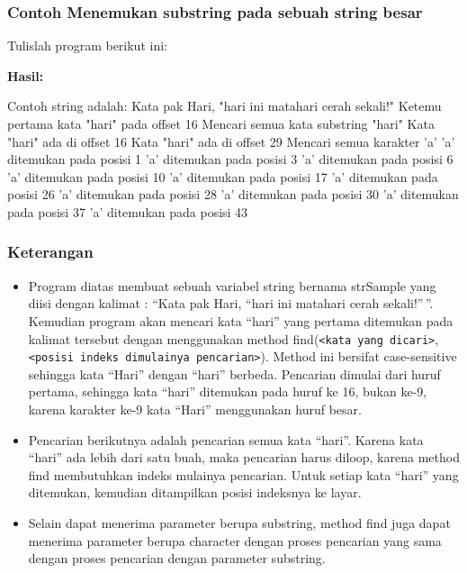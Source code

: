 {{\subsubsection*{Contoh Menemukan substring pada sebuah string besar}

Tulislah program berikut ini:



\textbf{Hasil:}

\begin{lcverbatim}
Contoh string adalah:
Kata pak Hari, "hari ini matahari cerah sekali!"
Ketemu pertama kata "hari" pada offset 16
Mencari semua kata substring "hari"
Kata "hari" ada di offset 16
Kata "hari" ada di offset 29
Mencari semua karakter 'a'
'a' ditemukan pada posisi 1
'a' ditemukan pada posisi 3
'a' ditemukan pada posisi 6
'a' ditemukan pada posisi 10
'a' ditemukan pada posisi 17
'a' ditemukan pada posisi 26
'a' ditemukan pada posisi 28
'a' ditemukan pada posisi 30
'a' ditemukan pada posisi 37
'a' ditemukan pada posisi 43
\end{lcverbatim}

\subsubsection*{Keterangan}

\begin{itemize}

\item
 Program diatas membuat sebuah variabel string bernama strSample yang
 diisi dengan kalimat : ``Kata pak Hari, ``hari ini matahari cerah
 sekali!''\,''. Kemudian program akan mencari kata ``hari'' yang
 pertama ditemukan pada kalimat tersebut dengan menggunakan method
 find(\texttt{\textless{}kata\ yang\ dicari\textgreater{}},\texttt{\textless{}posisi\ indeks\ dimulainya\ pencarian\textgreater{}}).
 Method ini bersifat case-sensitive sehingga kata ``Hari'' dengan
 ``hari'' berbeda. Pencarian dimulai dari huruf pertama, sehingga kata
 ``hari'' ditemukan pada huruf ke 16, bukan ke-9, karena karakter ke-9
 kata ``Hari'' menggunakan huruf besar.
\item
 Pencarian berikutnya adalah pencarian semua kata ``hari''. Karena kata
 ``hari'' ada lebih dari satu buah, maka pencarian harus diloop, karena
 method find membutuhkan indeks mulainya pencarian. Untuk setiap kata
 ``hari'' yang ditemukan, kemudian ditampilkan posisi indeksnya ke
 layar.
\item
 Selain dapat menerima parameter berupa substring, method find juga
 dapat menerima parameter berupa character dengan proses pencarian yang
 sama dengan proses pencarian dengan parameter substring.
\end{itemize}

}}
